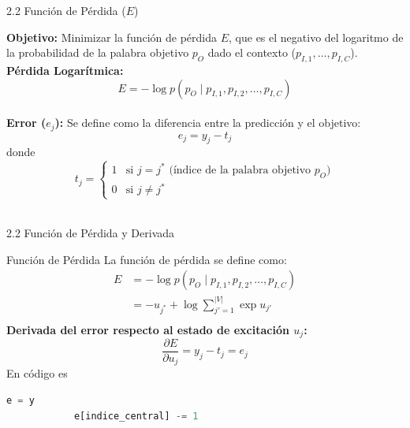 \documentclass{beamer}
\begin{document}
	
\begin{frame}[fragile]{2.2 Función de Pérdida ($E$)}
	\begin{block}{}
		\justifying
		\textbf{Objetivo:} Minimizar la función de pérdida $E$, que es el negativo del logaritmo de la probabilidad de la palabra objetivo $p_O$ dado el contexto ($p_{I,1}, \dots, p_{I,C}$).\\[0.2cm]
		
		\textbf{Pérdida Logarítmica:} 
		\[
		E = - \log p(p_O \mid p_{I,1}, p_{I,2}, \dots, p_{I,C})
		\] \\[0.1cm]
		
		\textbf{Error ($e_j$):} Se define como la diferencia entre la predicción y el objetivo:
		\[
		e_j = y_j - t_j
		\]
		donde
		\[
		t_j =
		\begin{cases}
			1 & \text{si } j = j^* \text{ (índice de la palabra objetivo $p_O$)}\\
			0 & \text{si } j \neq j^*
		\end{cases}
		\] \\[0.1cm]
	\end{block}

\end{frame}
	
\begin{frame}[fragile]{2.2 Función de Pérdida y Derivada}
	\begin{block}{Función de Pérdida}
		La función de pérdida se define como:
\[
\begin{aligned}
	E &= - \log p(p_O \mid p_{I,1}, p_{I,2}, \dots, p_{I,C}) \\
	&= - u_{j^*} + \log \sum_{j'=1}^{|V|} \exp u_{j'} \\
\end{aligned}
\]
		\textbf{Derivada del error respecto al estado de excitación $u_j$:}
		\[
		\frac{\partial E}{\partial u_j} = y_j - t_j = e_j
		\]
			En código es
		\begin{lstlisting}[language=Python]
			e = y
			e[indice_central] -= 1
		\end{lstlisting}

	\end{block}
\end{frame}
	
\end{document}

